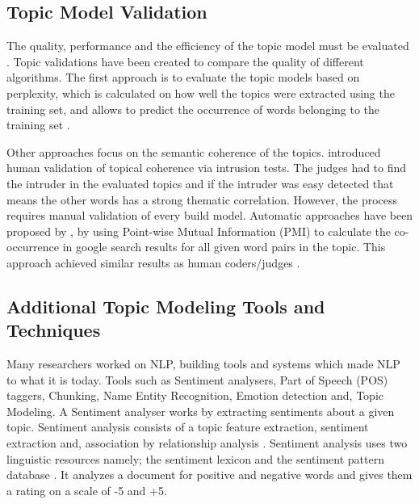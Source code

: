 \subsection{Topic Model Validation}
The quality, performance and the efficiency of the topic model must be evaluated \cite{ramirez2012topic}. Topic validations have been created to compare the quality of different algorithms. The first approach is to evaluate the topic models based on perplexity, which is calculated on how well the topics were extracted using the training set, and allows to predict the occurrence of words belonging to the training set \cite{ramirez2012topic}.

Other approaches focus on the semantic coherence of the topics.  introduced human validation of topical coherence via intrusion tests. The judges had to find the intruder in the evaluated topics and if the intruder was easy detected that means the other words has a strong thematic correlation. However, the process requires manual validation of every build model.
Automatic approaches have been proposed by , by using Point-wise Mutual Information (PMI) to calculate the co-occurrence in google search results for all given word pairs in the topic. This approach achieved similar results as human coders/judges \cite{alsumait2009topic}.

\subsection{Additional Topic Modeling Tools and Techniques}

Many researchers worked on NLP, building tools and systems which made NLP to what it is today. Tools such as Sentiment analysers, Part of Speech (POS) taggers, Chunking, Name Entity Recognition, Emotion detection and, Topic Modeling. 
A Sentiment analyser works by extracting sentiments about a given topic. Sentiment analysis consists of a topic feature extraction, sentiment extraction and, association by relationship analysis \cite{yi2003sentiment}. Sentiment analysis uses two linguistic resources namely; the sentiment lexicon and the sentiment pattern database \cite{nasukawa2003sentiment}. It analyzes a document for positive and negative words and gives them a rating on a scale of -5 and +5.


